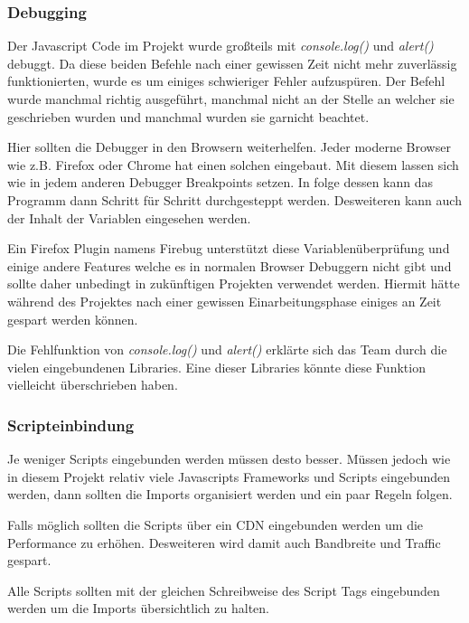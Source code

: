 \newpage

\subsubsection{Debugging}
Der Javascript Code im Projekt wurde großteils mit \textit{console.log()} und \textit{alert()} debuggt. Da diese beiden Befehle nach einer gewissen Zeit nicht mehr zuverlässig funktionierten, wurde es um einiges schwieriger Fehler aufzuspüren. Der Befehl wurde manchmal richtig ausgeführt, manchmal nicht an der Stelle an welcher sie geschrieben wurden und manchmal wurden sie garnicht beachtet. 

Hier sollten die Debugger in den Browsern weiterhelfen. Jeder moderne Browser wie z.B. Firefox oder Chrome hat einen solchen eingebaut. Mit diesem lassen sich wie in jedem anderen Debugger Breakpoints setzen. In folge dessen kann das Programm dann Schritt für Schritt durchgesteppt werden. Desweiteren kann auch der Inhalt der Variablen eingesehen werden. 

Ein Firefox Plugin namens Firebug unterstützt diese Variablenüberprüfung und einige andere Features welche es in normalen Browser Debuggern nicht gibt und sollte daher unbedingt in zukünftigen Projekten verwendet werden. Hiermit hätte während des Projektes nach einer gewissen Einarbeitungsphase einiges an Zeit gespart werden können. 


Die Fehlfunktion von \textit{console.log()} und \textit{alert()} erklärte sich das Team durch die vielen eingebundenen Libraries. Eine dieser Libraries könnte diese Funktion vielleicht überschrieben haben.

\newpage

\subsubsection{Scripteinbindung}
Je weniger Scripts eingebunden werden müssen desto besser. Müssen jedoch wie in diesem Projekt relativ viele Javascripts Frameworks und Scripts eingebunden werden, dann sollten die Imports organisiert werden und ein paar Regeln folgen.

Falls möglich sollten die Scripts über ein CDN eingebunden werden um die Performance zu erhöhen. Desweiteren wird damit auch Bandbreite und Traffic gespart. 

Alle Scripts sollten mit der gleichen Schreibweise des Script Tags eingebunden werden um die Imports übersichtlich zu halten. 

